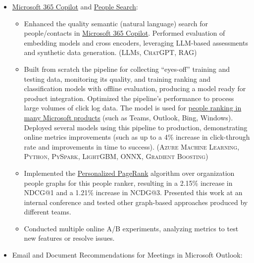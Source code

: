\documentclass{article}
\begin{document}
\begin{itemize}

\item \href{https://www.microsoft.com/en-gb/microsoft-copilot/organizations}{Microsoft 365 Copilot} and \href{https://learn.microsoft.com/en-us/graph/search-concept-person}{People Search}:

  \begin{itemize}

  \item Enhanced the quality semantic (natural language) search for people/contacts in \href{https://www.microsoft.com/en-us/microsoft-365/copilot}{Microsoft 365 Copilot}. Performed evaluation of embedding models and cross encoders, leveraging LLM-based assessments and synthetic data generation. (\textsc{LLMs}, \textsc{ChatGPT}, \textsc{RAG})

  \item Built from scratch the pipeline for collecting ``eyes-off'' training and testing data, monitoring its quality, and training ranking and classification models with offline evaluation, producing a model ready for product integration. Optimized the pipeline's performance to process large volumes of click log data. The model is used for \href{https://www.youtube.com/watch?v=a6HO4ekmmjU}{people ranking in many Microsoft products} (such as Teams, Outlook, Bing, Windows). Deployed several models using this pipeline to production, demonstrating online metrics improvements (such as up to a 4\% increase in click-through rate and improvements in time to success). (\textsc{Azure Machine Learning}, \textsc{Python}, \textsc{PySpark}, \textsc{LightGBM}, \textsc{ONNX}, \textsc{Gradient Boosting})

  \item Implemented the \href{https://www.cs.cornell.edu/~bindel/blurbs/edgeppr.html}{Personalized PageRank} algorithm over organization people graphs for this people ranker, resulting in a 2.15\% increase in NDCG@1 and a 1.21\% increase in NCDG@3. Presented this work at an internal conference and tested other graph-based approaches produced by different teams.

  \item Conducted multiple online A/B experiments, analyzing metrics to test new features or resolve issues.

  \end{itemize}

\item Email and Document Recommendations for Meetings in Microsoft Outlook:


\end{itemize}
\end{document}
